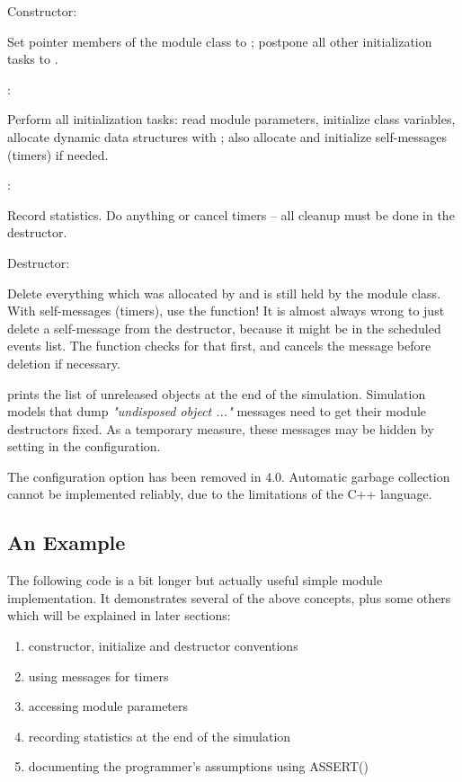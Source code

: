 \begin{description}

\item Constructor:

Set pointer members of the module class to ; postpone all other
initialization tasks to .

\item {}:

Perform all initialization tasks: read module parameters, initialize
class variables, allocate dynamic data structures with ;
also allocate and initialize self-messages (timers) if needed.

\item {}:

Record statistics. Do   anything or cancel timers --
all cleanup must be done in the destructor.

\item Destructor:

Delete everything which was allocated by  and is still held
by the module class. With self-messages (timers), use the
 function! It is almost always wrong
to just delete a self-message from the destructor, because it might be
in the scheduled events list. The  function
checks for that first, and cancels the message before deletion if necessary.

\end{description}

{\opp} prints the list of unreleased objects at the end of the simulation.
Simulation models that dump \textit{"undisposed object ..."} messages need
to get their module destructors fixed. As a temporary measure, these
messages may be hidden by setting  in the
configuration.

\begin{note}
    The  configuration option has been removed in {\opp} 4.0.
    Automatic garbage collection cannot be implemented reliably, due to the
    limitations of the C++ language.
\end{note}

\subsection{An Example}

The following code is a bit longer but actually useful simple module
implementation. It demonstrates several of the above concepts, plus
some others which will be explained in later sections:
\begin{enumerate}
  \item{constructor, initialize and destructor conventions}
  \item{using messages for timers}
  \item{accessing module parameters}
  \item{recording statistics at the end of the simulation}
  \item{documenting the programmer's assumptions using ASSERT()}
\end{enumerate}

